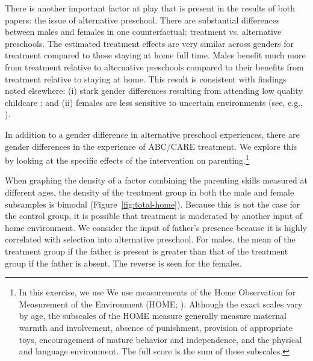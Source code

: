 There is another important factor at play that is present in the results of both papers: the issue of alternative preschool. There are substantial differences between males and females in one counterfactual: treatment vs. alternative preschools. The estimated treatment effects are very similar across genders for treatment compared to those staying at home full time. Males benefit much more from treatment relative to alternative preschools compared to their benefits from treatment relative to staying at home. This result is consistent with findings noted elsewhere: (i) stark gender differences resulting from attending low quality childcare \citep{Kottelenberg-Lehrer_2014_Gender-Effects,Baker_Gruber_Milligan_2015_Noncog_Defects}; and (ii) females are less sensitive to uncertain environments (see, e.g., \citealp{Autor-etal_2015_Family-Disadvantage}).

In addition to a gender difference in alternative preschool experiences, there are gender differences in the experience of ABC/CARE treatment. We explore this by looking at the specific effects of the intervention on parenting.\footnote{In this exercise, we use We use measurements of the Home Observation for Measurement of the Environment (HOME; \citet{Bradley-Caldwell_1977_AJMD}). Although the exact scales vary by age, the subscales of the HOME measure generally measure maternal warmth and involvement, absence of punishment, provision of appropriate toys, encouragement of mature behavior and independence, and the physical and language environment. The full score is the sum of these subscales.}

When graphing the density of a factor combining the parenting skills measured at different ages, the density of the treatment group in both the male and female subsamples is bimodal (Figure~\ref{fig:total-home}). Because this is not the case for the control group, it is possible that treatment is moderated by another input of home environment. We consider the input of father's presence because it is highly correlated with selection into alternative preschool. For males, the mean of the treatment group if the father is present is greater than that of the treatment group if the father is absent. The reverse is seen for the females.

